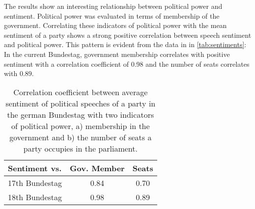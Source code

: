 \documentclass[11pt]{article}
\begin{document}
The results show an interesting relationship between political power and sentiment. Political power was evaluated in terms of membership of the government. Correlating these indicators of political power with the mean sentiment of a party shows a strong positive correlation between speech sentiment and political power. This pattern is evident from the data in 
in \autoref{tab:sentiments}: In the current Bundestag, government membership correlates with positive sentiment with a correlation coefficient of 0.98 and the number of seats correlates with 0.89.

%
%

\begin{table}[t]
\caption{
\label{tab:sentiments}
Correlation coefficient between average sentiment of political speeches of a party in the german Bundestag with two indicators of political power, a) membership in the government and b) the number of seats a party occupies in the parliament.
}
\begin{center}
\begin{tabular}{lcc}
   Sentiment vs. &          Gov. Member    &  Seats\\
\hline\hline
17th Bundestag    &  0.84 & 0.70\\
18th Bundestag   &  0.98 & 0.89\\
%
\end{tabular}
\end{center}
\end{table}
\end{document}
